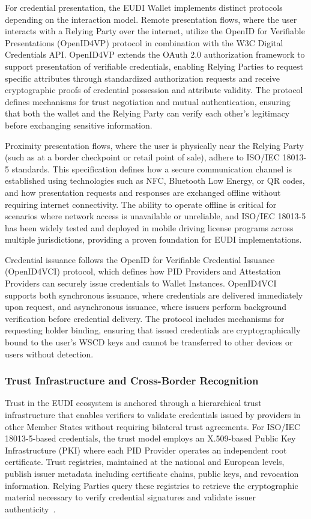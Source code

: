 \documentclass[sigconf,balance,nonacm,authordraft]{acmart}
\begin{document}
For credential presentation, the EUDI Wallet implements distinct protocols depending on the interaction model. Remote presentation flows, where the user interacts with a Relying Party over the internet, utilize the OpenID for Verifiable Presentations (OpenID4VP) protocol in combination with the W3C Digital Credentials API. OpenID4VP extends the OAuth 2.0 authorization framework to support presentation of verifiable credentials, enabling Relying Parties to request specific attributes through standardized authorization requests and receive cryptographic proofs of credential possession and attribute validity. The protocol defines mechanisms for trust negotiation and mutual authentication, ensuring that both the wallet and the Relying Party can verify each other's legitimacy before exchanging sensitive information.

Proximity presentation flows, where the user is physically near the Relying Party (such as at a border checkpoint or retail point of sale), adhere to ISO/IEC 18013-5 standards. This specification defines how a secure communication channel is established using technologies such as NFC, Bluetooth Low Energy, or QR codes, and how presentation requests and responses are exchanged offline without requiring internet connectivity. The ability to operate offline is critical for scenarios where network access is unavailable or unreliable, and ISO/IEC 18013-5 has been widely tested and deployed in mobile driving license programs across multiple jurisdictions, providing a proven foundation for EUDI implementations.

Credential issuance follows the OpenID for Verifiable Credential Issuance (OpenID4VCI) protocol, which defines how PID Providers and Attestation Providers can securely issue credentials to Wallet Instances. OpenID4VCI supports both synchronous issuance, where credentials are delivered immediately upon request, and asynchronous issuance, where issuers perform background verification before credential delivery. The protocol includes mechanisms for requesting holder binding, ensuring that issued credentials are cryptographically bound to the user's WSCD keys and cannot be transferred to other devices or users without detection.

\subsubsection{Trust Infrastructure and Cross-Border Recognition}

Trust in the EUDI ecosystem is anchored through a hierarchical trust infrastructure that enables verifiers to validate credentials issued by providers in other Member States without requiring bilateral trust agreements. For ISO/IEC 18013-5-based credentials, the trust model employs an X.509-based Public Key Infrastructure (PKI) where each PID Provider operates an independent root certificate. Trust registries, maintained at the national and European levels, publish issuer metadata including certificate chains, public keys, and revocation information. Relying Parties query these registries to retrieve the cryptographic material necessary to verify credential signatures and validate issuer authenticity~\cite{PortoThesis_Structure,Finextra_SSI_Components}.
\end{document}
